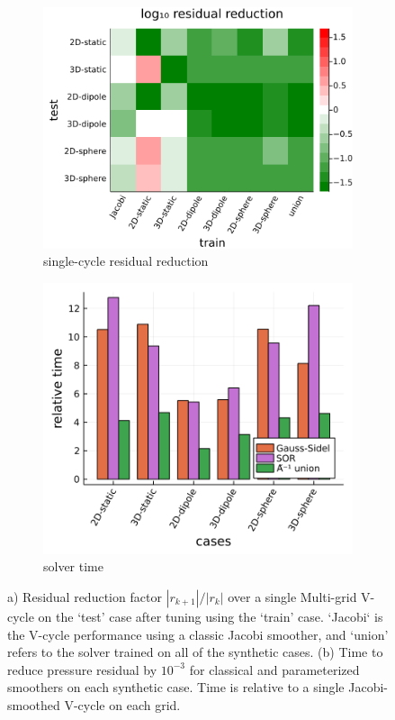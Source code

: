 \documentclass[]{elsarticle}
\begin{document}
\begin{figure}
    \centering
    \begin{subfigure}[b]{0.47\textwidth}
        \centering
        \includegraphics[width=\textwidth]{figures/crossloss.png}
        \caption{single-cycle residual reduction}
        \label{fig:cross plot}
    \end{subfigure}
    \hfill
    \begin{subfigure}[b]{0.47\textwidth}
        \centering
        \includegraphics[width=\textwidth]{figures/synthetic_timing.png}
        \caption{solver time}
        \label{fig:synthetic time}
    \end{subfigure}
    \caption{a) Residual reduction factor $|r_{k+1}|/|r_k|$ over a single Multi-grid V-cycle on the `test' case after tuning using the `train' case. `Jacobi` is the V-cycle performance using a classic Jacobi smoother, and `union' refers to the solver trained on all of the synthetic cases. (b) Time to reduce pressure residual by $10^{-3}$ for classical and parameterized smoothers on each synthetic case. Time is relative to a single Jacobi-smoothed V-cycle on each grid.}
    \label{fig:synthetic results}
\end{figure}
\end{document}
